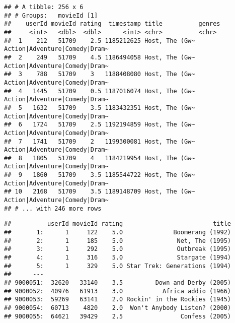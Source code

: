 \documentclass[
]{article}
\newenvironment{Shaded}{\begin{snugshade}}{\end{snugshade}}
\newcommand{\CharTok}[1]{\textcolor[rgb]{0.31,0.60,0.02}{#1}}
\newcommand{\CommentTok}[1]{\textcolor[rgb]{0.56,0.35,0.01}{\textit{#1}}}
\newcommand{\DataTypeTok}[1]{\textcolor[rgb]{0.13,0.29,0.53}{#1}}
\newcommand{\KeywordTok}[1]{\textcolor[rgb]{0.13,0.29,0.53}{\textbf{#1}}}
\newcommand{\NormalTok}[1]{#1}
\newcommand{\OperatorTok}[1]{\textcolor[rgb]{0.81,0.36,0.00}{\textbf{#1}}}
\newcommand{\StringTok}[1]{\textcolor[rgb]{0.31,0.60,0.02}{#1}}
\begin{document}
\begin{verbatim}
## # A tibble: 256 x 6
## # Groups:   movieId [1]
##    userId movieId rating  timestamp title          genres                       
##     <int>   <dbl>  <dbl>      <int> <chr>          <chr>                        
##  1    212   51709    2.5 1185212625 Host, The (Gw~ Action|Adventure|Comedy|Dram~
##  2    249   51709    4.5 1186494058 Host, The (Gw~ Action|Adventure|Comedy|Dram~
##  3    788   51709    3   1188408080 Host, The (Gw~ Action|Adventure|Comedy|Dram~
##  4   1445   51709    0.5 1187016074 Host, The (Gw~ Action|Adventure|Comedy|Dram~
##  5   1632   51709    3.5 1183432351 Host, The (Gw~ Action|Adventure|Comedy|Dram~
##  6   1724   51709    2.5 1192194859 Host, The (Gw~ Action|Adventure|Comedy|Dram~
##  7   1741   51709    2   1199300081 Host, The (Gw~ Action|Adventure|Comedy|Dram~
##  8   1805   51709    4   1184219954 Host, The (Gw~ Action|Adventure|Comedy|Dram~
##  9   1860   51709    3.5 1185544722 Host, The (Gw~ Action|Adventure|Comedy|Dram~
## 10   2168   51709    3.5 1189148709 Host, The (Gw~ Action|Adventure|Comedy|Dram~
## # ... with 246 more rows
\end{verbatim}

\begin{Shaded}
\end{Shaded}

\begin{verbatim}
##          userId movieId rating                         title
##       1:      1     122    5.0              Boomerang (1992)
##       2:      1     185    5.0               Net, The (1995)
##       3:      1     292    5.0               Outbreak (1995)
##       4:      1     316    5.0               Stargate (1994)
##       5:      1     329    5.0 Star Trek: Generations (1994)
##      ---                                                    
## 9000051:  32620   33140    3.5         Down and Derby (2005)
## 9000052:  40976   61913    3.0           Africa addio (1966)
## 9000053:  59269   63141    2.0 Rockin' in the Rockies (1945)
## 9000054:  60713    4820    2.0  Won't Anybody Listen? (2000)
## 9000055:  64621   39429    2.5                Confess (2005)
\end{verbatim}
\end{document}
